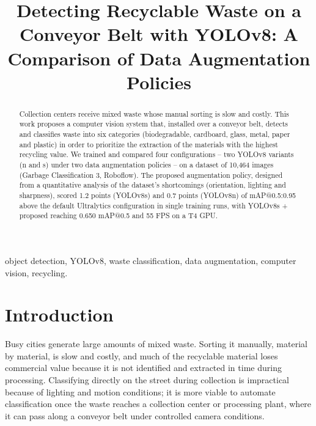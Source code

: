 \documentclass[conference]{IEEEtran}
\begin{document}
\title{Detecting Recyclable Waste on a Conveyor Belt with YOLOv8: A Comparison of Data Augmentation Policies}

\author{
}

\maketitle

\begin{abstract}
Collection centers receive mixed waste whose manual sorting is slow and costly.
This work proposes a computer vision system that, installed over a conveyor belt, detects and
classifies waste into six categories (biodegradable, cardboard, glass, metal, paper and
plastic) in order to prioritize the extraction of the materials with the highest recycling
value. We trained and compared four configurations -- two YOLOv8 variants (n and s) under two
data augmentation policies -- on a dataset of 10,464 images (Garbage Classification 3,
Roboflow). The proposed augmentation policy, designed from a quantitative analysis of the
dataset's shortcomings (orientation, lighting and sharpness), scored 1.2 points (YOLOv8s) and
0.7 points (YOLOv8n) of mAP@0.5:0.95 above the default Ultralytics configuration in single
training runs, with YOLOv8s + proposed reaching 0.650 mAP@0.5 and 55 FPS on a T4 GPU.
\end{abstract}

\begin{IEEEkeywords}
object detection, YOLOv8, waste classification, data augmentation, computer vision, recycling.
\end{IEEEkeywords}

\section{Introduction}

Busy cities generate large amounts of mixed waste. Sorting it manually, material by material,
is slow and costly, and much of the recyclable material loses commercial value because it is
not identified and extracted in time during processing. Classifying directly on the street
during collection is impractical because of lighting and motion conditions; it is more viable
to automate classification once the waste reaches a collection center or processing plant,
where it can pass along a conveyor belt under controlled camera conditions.
\end{document}
